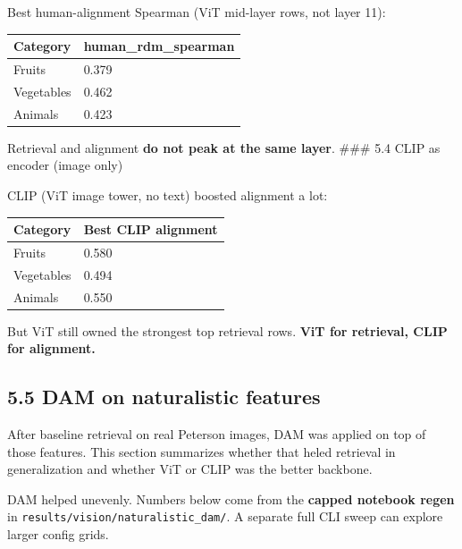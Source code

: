 \documentclass[
  11pt,
]{memoir}
\begin{document}
Best human-alignment Spearman (ViT mid-layer rows, not layer 11):

\begin{longtable}[]{@{}ll@{}}
\toprule\noalign{}
Category & human\_rdm\_spearman \\
\midrule\noalign{}
\endhead
\bottomrule\noalign{}
\endlastfoot
Fruits & 0.379 \\
Vegetables & 0.462 \\
Animals & 0.423 \\
\end{longtable}

Retrieval and alignment \textbf{do not peak at the same layer}. \#\#\#
5.4 CLIP as encoder (image only)

CLIP (ViT image tower, no text) boosted alignment a lot:

\begin{longtable}[]{@{}ll@{}}
\toprule\noalign{}
Category & Best CLIP alignment \\
\midrule\noalign{}
\endhead
\bottomrule\noalign{}
\endlastfoot
Fruits & 0.580 \\
Vegetables & 0.494 \\
Animals & 0.550 \\
\end{longtable}

But ViT still owned the strongest top retrieval rows. \textbf{ViT for
retrieval, CLIP for alignment.}

\subsection{5.5 DAM on naturalistic
features}\label{dam-on-naturalistic-features}

After baseline retrieval on real Peterson images, DAM was applied on top
of those features. This section summarizes whether that heled retrieval
in generalization and whether ViT or CLIP was the better backbone.

DAM helped unevenly. Numbers below come from the \textbf{capped notebook
regen} in {\ttfamily\nolinkurl{results/vision/naturalistic\_dam/}}. A separate full
CLI sweep can explore larger config grids.
\end{document}
